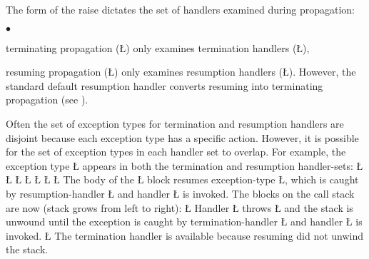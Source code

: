 \documentclass[openright,twoside]{report}
\begin{document}
The form of the raise dictates the set of handlers examined during propagation:
\begin{list}{$\bullet$}{\topsep=3pt\parsep=0pt\itemsep=0pt}
\item
terminating propagation (\LGinlinetrue\LGbegin\lgrinde\L{}\endlgrinde\LGend{}) only examines termination handlers (\LGinlinetrue\LGbegin\lgrinde\L{}\endlgrinde\LGend{}),
\item
resuming propagation (\LGinlinetrue\LGbegin\lgrinde\L{}\endlgrinde\LGend{}) only examines resumption handlers (\LGinlinetrue\LGbegin\lgrinde\L{}\endlgrinde\LGend{}).
However, the standard default resumption handler converts resuming into terminating propagation (see ).
\end{list}
Often the set of exception types for termination and resumption handlers are disjoint because each exception type has a specific action.
However, it is possible for the set of exception types in each handler set to overlap.
For example, the exception type \LGinlinetrue\LGbegin\lgrinde\L{}\endlgrinde\LGend{} appears in both the termination and resumption handler-sets:
\LGinlinefalse\LGbegin\lgrinde
\L{}
\L{}
\L{\LB{}}
\L{\LB{}}
\L{\LB{}}
\CE{}\L{\LB{}}
\CE{}\L{\LB{\}}}
\endlgrinde\LGend
The body of the \LGinlinetrue\LGbegin\lgrinde\L{}\endlgrinde\LGend{} block resumes exception-type \LGinlinetrue\LGbegin\lgrinde\L{}\endlgrinde\LGend{}, which is caught by resumption-handler \LGinlinetrue\LGbegin\lgrinde\L{}\endlgrinde\LGend{} and handler \LGinlinetrue\LGbegin\lgrinde\L{}\endlgrinde\LGend{} is invoked.
The blocks on the call stack are now (stack grows from left to right):
\LGinlinefalse\LGbegin\lgrinde
\L{}
\endlgrinde\LGend
Handler \LGinlinetrue\LGbegin\lgrinde\L{}\endlgrinde\LGend{} throws \LGinlinetrue\LGbegin\lgrinde\L{}\endlgrinde\LGend{} and the stack is unwound until the exception is caught by termination-handler \LGinlinetrue\LGbegin\lgrinde\L{}\endlgrinde\LGend{} and handler \LGinlinetrue\LGbegin\lgrinde\L{}\endlgrinde\LGend{} is invoked.
\LGinlinefalse\LGbegin\lgrinde
\L{}
\endlgrinde\LGend
The termination handler is available because resuming did not unwind the stack.
\end{document}

